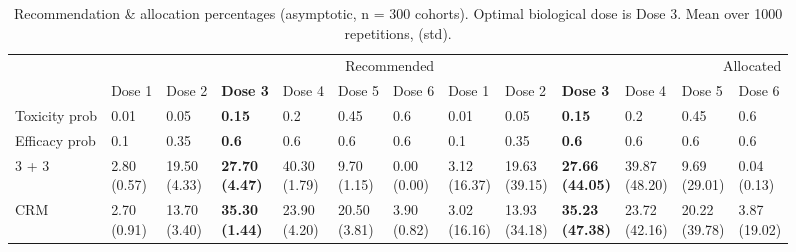 \begin{table}[H]
\centering
\caption{Recommendation \& allocation percentages (asymptotic, n = 300 cohorts). Optimal biological dose is Dose 3. Mean over 1000 repetitions, (std).}
\label{tab:asym_table2}
\begin{tabular}{lllllllllllll}
\toprule
 & \multicolumn{6}{r}{Recommended} & \multicolumn{6}{r}{Allocated} \\
 & Dose 1 & Dose 2 & \bfseries Dose 3 & Dose 4 & Dose 5 & Dose 6 & Dose 1 & Dose 2 & \bfseries Dose 3 & Dose 4 & Dose 5 & Dose 6 \\
\midrule
Toxicity prob & 0.01 & 0.05 & {\cellcolor[HTML]{C8E6C9}} \bfseries 0.15 & 0.2 & 0.45 & 0.6 & 0.01 & 0.05 & {\cellcolor[HTML]{C8E6C9}} \bfseries 0.15 & 0.2 & 0.45 & 0.6 \\
Efficacy prob & 0.1 & 0.35 & {\cellcolor[HTML]{C8E6C9}} \bfseries 0.6 & 0.6 & 0.6 & 0.6 & 0.1 & 0.35 & {\cellcolor[HTML]{C8E6C9}} \bfseries 0.6 & 0.6 & 0.6 & 0.6 \\
3 + 3 & \makecell{2.80 \\ (0.57)} & \makecell{19.50 \\ (4.33)} & {\cellcolor[HTML]{C8E6C9}} \bfseries \makecell{27.70 \\ (4.47)} & \makecell{40.30 \\ (1.79)} & \makecell{9.70 \\ (1.15)} & \makecell{0.00 \\ (0.00)} & \makecell{3.12 \\ (16.37)} & \makecell{19.63 \\ (39.15)} & {\cellcolor[HTML]{C8E6C9}} \bfseries \makecell{27.66 \\ (44.05)} & \makecell{39.87 \\ (48.20)} & \makecell{9.69 \\ (29.01)} & \makecell{0.04 \\ (0.13)} \\
CRM & \makecell{2.70 \\ (0.91)} & \makecell{13.70 \\ (3.40)} & {\cellcolor[HTML]{C8E6C9}} \bfseries \makecell{35.30 \\ (1.44)} & \makecell{23.90 \\ (4.20)} & \makecell{20.50 \\ (3.81)} & \makecell{3.90 \\ (0.82)} & \makecell{3.02 \\ (16.16)} & \makecell{13.93 \\ (34.18)} & {\cellcolor[HTML]{C8E6C9}} \bfseries \makecell{35.23 \\ (47.38)} & \makecell{23.72 \\ (42.16)} & \makecell{20.22 \\ (39.78)} & \makecell{3.87 \\ (19.02)} \\

\end{tabular}
\end{table}
